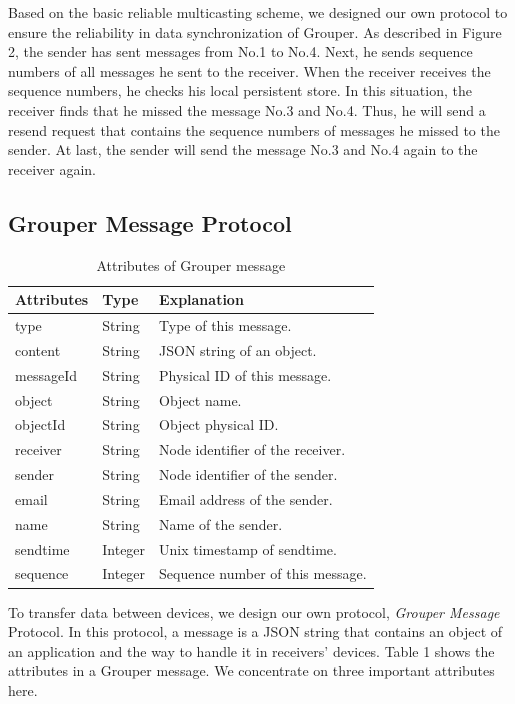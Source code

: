 \documentclass[twocolumn,10pt]{article}
\begin{document}
Based on the basic reliable multicasting scheme, we designed our own protocol to ensure the reliability in data synchronization of Grouper. 
As described in Figure 2, the sender has sent messages from No.1 to No.4. 
Next, he sends sequence numbers of all messages he sent to the receiver. 
When the receiver receives the sequence numbers, he checks his local persistent store. 
In this situation, the receiver finds that he missed the message No.3 and No.4. 
Thus, he will send a resend request that contains the sequence numbers of messages he missed to the sender. 
At last, the sender will send the message No.3 and No.4 again to the receiver again.

\subsection{Grouper Message Protocol}

\begin{table}[]
	\centering
	\caption{Attributes of Grouper message}
	\label{my-label}
	\begin{tabular}{lll}
		\hline
		\textbf{Attributes} & \textbf{Type} & \textbf{Explanation} \\ \hline
		type & String & Type of this message. \\
		content & String & JSON string of an object. \\
		messageId & String & Physical ID of this message. \\
		object & String & Object name. \\
		objectId & String & Object physical ID. \\
		receiver & String & Node identifier of the receiver. \\
		sender & String & Node identifier of the sender. \\
		email & String & Email address of the sender. \\
		name & String & Name of the sender. \\
		sendtime & Integer & Unix timestamp of sendtime. \\
		sequence & Integer & Sequence number of this message. \\ \hline
	\end{tabular}
\end{table}

To transfer data between devices, we design our own protocol, \emph{Grouper Message} Protocol. 
In this protocol, a message is a JSON string that contains an object of an application and the way to handle it in receivers’ devices.
Table 1 shows the attributes in a Grouper message.
We concentrate on three important attributes here.
\end{document}
